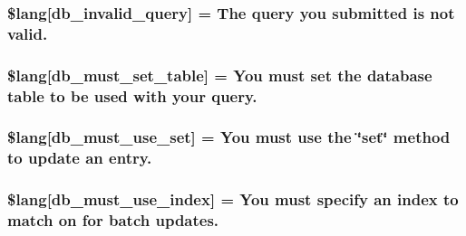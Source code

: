 \subsubsection[{\$lang}]{\setlength{\rightskip}{0pt plus 5cm}\$lang\mbox{[}\textquotesingle{}db\+\_\+invalid\+\_\+query\textquotesingle{}\mbox{]} = \textquotesingle{}The query you submitted is not valid.\textquotesingle{}}\label{db__lang_8php_a2cbf4ee929f45a29a0dcf21280bad485}
\hypertarget{db__lang_8php_a0f5d469f071f2b5327b44761f4a06396}{}
\subsubsection[{\$lang}]{\setlength{\rightskip}{0pt plus 5cm}\$lang\mbox{[}\textquotesingle{}db\+\_\+must\+\_\+set\+\_\+table\textquotesingle{}\mbox{]} = \textquotesingle{}You must set the database table to be used with your query.\textquotesingle{}}\label{db__lang_8php_a0f5d469f071f2b5327b44761f4a06396}
\hypertarget{db__lang_8php_a55e22fb14cedc8ee7f70980bf7f37308}{}
\subsubsection[{\$lang}]{\setlength{\rightskip}{0pt plus 5cm}\$lang\mbox{[}\textquotesingle{}db\+\_\+must\+\_\+use\+\_\+set\textquotesingle{}\mbox{]} = \textquotesingle{}You must use the \char`\"{}set\char`\"{} method to update an entry.\textquotesingle{}}\label{db__lang_8php_a55e22fb14cedc8ee7f70980bf7f37308}
\hypertarget{db__lang_8php_a708419b6b94728c30474ee5fdde3b99b}{}
\subsubsection[{\$lang}]{\setlength{\rightskip}{0pt plus 5cm}\$lang\mbox{[}\textquotesingle{}db\+\_\+must\+\_\+use\+\_\+index\textquotesingle{}\mbox{]} = \textquotesingle{}You must specify an index to match on for batch updates.\textquotesingle{}}\label{db__lang_8php_a708419b6b94728c30474ee5fdde3b99b}
\hypertarget{db__lang_8php_af946769a3dd5679c60e6f2ef5f7a5aa1}{}
